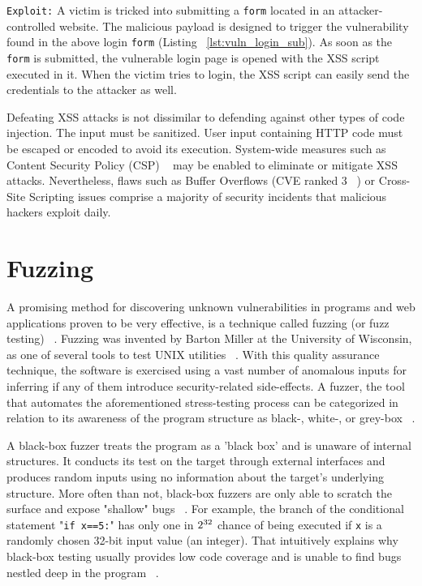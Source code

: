 {\tt Exploit:} A victim is tricked into submitting a {\tt form} located in an attacker-controlled website. The malicious payload is designed to trigger the vulnerability found in the above login {\tt form} (Listing ~\ref{lst:vuln_login_sub}). As soon as the {\tt form} is submitted, the vulnerable login page is opened with the XSS script executed in it. When the victim tries to login, the XSS script can easily send the credentials to the attacker as well. 

Defeating XSS attacks is not dissimilar to defending against other types of code injection.
The input must be sanitized. User input containing HTTP code must be escaped or encoded to avoid its execution. System-wide measures such as Content Security Policy (CSP) ~\cite{csp_def} may be enabled to eliminate or mitigate XSS attacks. Nevertheless, flaws such as Buffer Overflows (CVE ranked 3 ~\cite{cve}) or Cross-Site Scripting issues comprise a majority of security incidents that malicious hackers exploit daily. 

\section{Fuzzing}
A promising method for discovering unknown vulnerabilities in programs and web applications proven to be very effective, is a technique called fuzzing (or fuzz testing) ~\cite{fuzzing_def}. Fuzzing was invented by Barton Miller at the University of Wisconsin, as one of several tools to test UNIX utilities ~\cite{mller1990fuzz}. With this quality assurance technique, the software is exercised using a vast number of anomalous inputs for inferring if any of them introduce security-related side-effects. A fuzzer, the tool that automates the aforementioned stress-testing process can be categorized in relation to its awareness of the program structure as black-, white-, or grey-box ~\cite{fuzzing_book}. 

A black-box fuzzer treats the program as a 'black box' and is unaware of internal structures. It conducts its test on the target through external interfaces and produces random inputs using no information about the target's underlying structure. More often than not, black-box fuzzers are only able to scratch the surface and expose "shallow" bugs ~\cite{fuzzing_owasp}. For example, the branch of the conditional statement "{\tt if x==5:}" has only one in $2\textsuperscript{32}$ chance of being executed if {\tt x} is a randomly chosen 32-bit input value (\ie an integer). That intuitively explains why black-box testing usually provides low code coverage and is unable to find bugs nestled deep in the program ~\cite{Godefroid2008AutomatedWF}.

